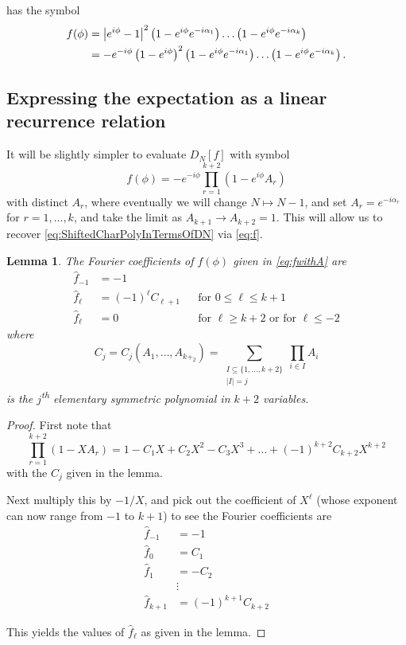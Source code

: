 \documentclass[12pt,a4paper,reqno]{amsart}
\newtheorem{lemma}{Lemma}
\theoremstyle{remark}
\numberwithin{equation}{section}
\begin{document}
has the symbol
\begin{align}
	f(\phi) &=\left|e^{i\phi}-1\right|^2   \left(1-e^{i\phi} e^{-i\alpha_1} \right) \dots  \left(1-e^{i\phi} e^{-i\alpha_k} \right) \notag \\
&=-e^{-i\phi} \left(1-e^{i\phi}\right)^2   \left(1-e^{i\phi} e^{-i\alpha_1} \right) \dots  \left(1-e^{i\phi} e^{-i\alpha_k} \right). \label{eq:f}
\end{align}



\subsection{Expressing the expectation as a linear recurrence relation} \hfill

It will be slightly simpler to evaluate $D_{N}[f]$
with symbol
\begin{equation}\label{eq:fwithA}
f(\phi) = -e^{-i\phi} \prod_{r=1}^{k+2} \left(1-e^{i\phi} A_r \right)
\end{equation}
with distinct $A_r$, where eventually we will change $N \mapsto N-1$, and set $A_{r} = e^{-i \alpha_r}$ for $r=1,\dots,k$, and take the limit as $A_{k+1} \to A_{k+2} =1$. This will allow us to recover \eqref{eq:ShiftedCharPolyInTermsOfDN} via \eqref{eq:f}.


\begin{lemma}\label{lem:fHat}
The Fourier coefficients of $f(\phi)$ given in \eqref{eq:fwithA} are
\begin{align*}
    \widehat f_{-1} &= -1 \\
    \widehat f_\ell &= (-1)^\ell C_{\ell+1} && \text{for $0 \leq \ell \leq k+1$} \\
    \widehat f_{\ell} &= 0 && \text{for $\ell \geq k+2$ or for $\ell \leq -2$}
\end{align*}
where
\[
C_j = C_j(A_1,\dots,A_{k+_2}) = \sum_{\substack{I \subseteq \{1,\dots,k+2\} \\ |I|=j}} \prod_{i \in I} A_i
\]
is the $j$\textsuperscript{th} elementary symmetric polynomial in $k+2$ variables.
\end{lemma}



\begin{proof}
First note that
\[
\prod_{r=1}^{k+2} \left(1-X A_r\right)  = 1 - C_1 X +  C_2 X^2 -  C_3 X^3 + \dots + (-1)^{k+2}  C_{k+2} X^{k+2}
\]
with the $C_j$ given in the lemma.

Next multiply this by $-1/X$, and pick out the coefficient of $X^\ell$ (whose exponent can now range from $-1$ to $k+1$) to see the Fourier coefficients are
\begin{align*}
\widehat f_{-1}&=-1\\
\widehat f_0 &=  C_1\\
\widehat f_1 &= - C_2\\
&\vdots\\
\widehat f_{k+1} &= (-1)^{k+1} C_{k+2}
\end{align*}


This yields the values of $\widehat f_{\ell}$ as given in the lemma.
\end{proof}
\end{document}
